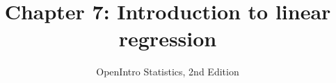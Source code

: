 \documentclass[slidestop,compress,mathserif]{beamer}
\title[Chp 7: Intro. to linear regression]{Chapter 7: Introduction to linear regression}
\author{OpenIntro Statistics, 2nd Edition}
\date{}
\institute{}
\begin{document}


\begin{frame}[plain]

\titlepage

\end{frame}








\end{document}
